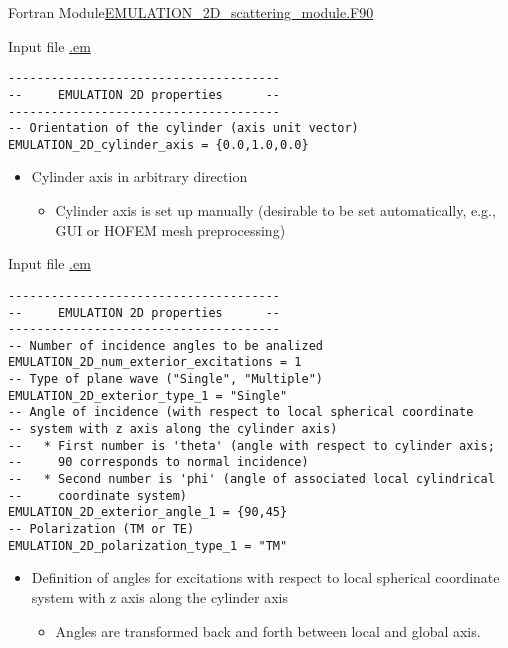   \begin{frame}{Fortran Module}{\url{EMULATION_2D_scattering_module.F90} }

    \begin{block}{Input file \url{.em}} 
      \begin{lstlisting}[basicstyle=\ttfamily\footnotesize,tabsize=3,frame=none]
--------------------------------------
--     EMULATION 2D properties      --
--------------------------------------
-- Orientation of the cylinder (axis unit vector)
EMULATION_2D_cylinder_axis = {0.0,1.0,0.0}
     \end{lstlisting}
   \end{block}


   \begin{itemize}
   \item Cylinder axis in arbitrary direction
     \begin{itemize}
     \item Cylinder axis is set up manually (desirable to be set
       automatically, e.g., GUI or HOFEM mesh preprocessing)
     \end{itemize}
   \end{itemize}     

   
   \framebreak %
    \begin{block}{Input file \url{.em}} 
      \begin{lstlisting}[basicstyle=\ttfamily\footnotesize,tabsize=3,frame=none]
--------------------------------------
--     EMULATION 2D properties      --
--------------------------------------
-- Number of incidence angles to be analized
EMULATION_2D_num_exterior_excitations = 1
-- Type of plane wave ("Single", "Multiple")
EMULATION_2D_exterior_type_1 = "Single"
-- Angle of incidence (with respect to local spherical coordinate
-- system with z axis along the cylinder axis)
--   * First number is 'theta' (angle with respect to cylinder axis;
--     90 corresponds to normal incidence)
--   * Second number is 'phi' (angle of associated local cylindrical
--     coordinate system)
EMULATION_2D_exterior_angle_1 = {90,45}
-- Polarization (TM or TE)
EMULATION_2D_polarization_type_1 = "TM"
     \end{lstlisting}
   \end{block}

   \framebreak %

   \begin{itemize}
   \item Definition of angles for excitations with respect to local
     spherical coordinate system with z axis along the cylinder axis
     \begin{itemize}
     \item Angles are transformed back and forth between local and
       global axis. 
     \end{itemize}


\end{itemize}
\end{frame}
